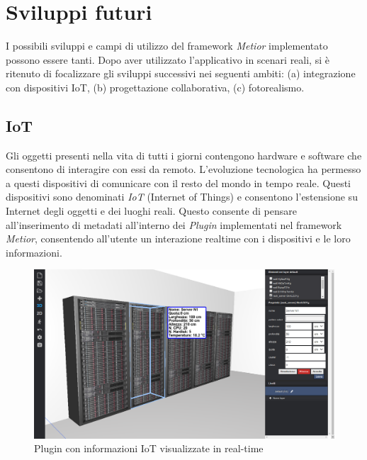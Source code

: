 \section{Sviluppi futuri}
\label{sec:conclusions_section_2}

I possibili sviluppi e campi di utilizzo del framework \emph{Metior} implementato possono essere tanti.
Dopo aver utilizzato l'applicativo in scenari reali, si è ritenuto di focalizzare gli sviluppi successivi nei seguenti ambiti:
(a) integrazione con dispositivi IoT, (b) progettazione collaborativa, (c) fotorealismo.

\subsection{IoT}
\label{sec:conclusions_section_2_sub_1}
Gli oggetti presenti nella vita di tutti i giorni contengono hardware e software
che consentono di interagire con essi da remoto. L'evoluzione tecnologica ha permesso a questi dispositivi
di comunicare con il resto del mondo in tempo reale. Questi dispositivi sono denominati \emph{IoT} (Internet of Things) e
consentono l'estensione su Internet degli oggetti e dei luoghi reali. Questo consente di pensare all'inserimento di
metadati all'interno dei \emph{Plugin} implementati nel framework \emph{Metior},
consentendo all'utente un interazione realtime con i dispositivi e le loro informazioni.\\

\begin{figure}[htbp] %
   \centering
   \includegraphics[width=1\linewidth]{images/iot}
   \caption{Plugin con informazioni IoT visualizzate in real-time}
   \label{fig:iot}
   \end{figure}

\newpage

